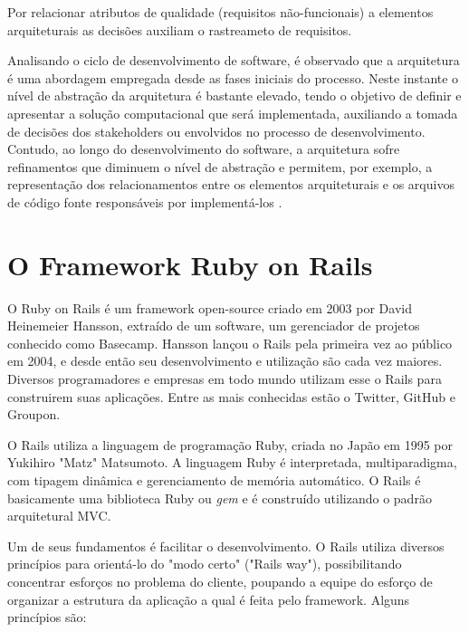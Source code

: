 Por relacionar atributos de qualidade (requisitos não-funcionais) a elementos arquiteturais as decisões auxiliam o rastreameto de requisitos.

Analisando o ciclo de desenvolvimento de software, é observado que a arquitetura é uma abordagem empregada desde as fases iniciais do processo. Neste instante o nível de abstração da arquitetura é bastante elevado, tendo o objetivo de definir e apresentar a solução computacional que será implementada, auxiliando a tomada de decisões dos stakeholders ou envolvidos no processo de desenvolvimento. Contudo, ao longo do desenvolvimento do software, a arquitetura sofre refinamentos que diminuem o nível de abstração e permitem, por exemplo, a representação dos relacionamentos entre os elementos arquiteturais e os arquivos de código fonte responsáveis por implementá-los \cite{clements2002documenting}.


\section{O Framework Ruby on Rails}

O Ruby on Rails é um framework open-source criado em 2003 por David Heinemeier Hansson, extraído de um software, um gerenciador de projetos conhecido como Basecamp.
Hansson lançou o Rails pela primeira vez ao público em 2004, e desde então seu desenvolvimento e utilização são cada vez maiores. Diversos programadores e empresas em todo mundo utilizam esse o Rails para construirem suas aplicações. Entre as mais conhecidas estão o Twitter, GitHub e Groupon. 

O Rails utiliza a linguagem de programação Ruby, criada no Japão em 1995 por Yukihiro "Matz" Matsumoto. A linguagem Ruby é interpretada, multiparadigma, com tipagem dinâmica e gerenciamento de memória automático. O Rails é basicamente uma biblioteca Ruby ou \textit{gem} e é construído utilizando o padrão arquitetural MVC.

Um de seus fundamentos é facilitar o desenvolvimento. O Rails utiliza diversos princípios para orientá-lo do "modo certo" ("Rails way"), possibilitando concentrar esforços no problema do cliente, poupando a equipe do esforço de organizar a estrutura da aplicação a qual é feita pelo framework. Alguns princípios são:

